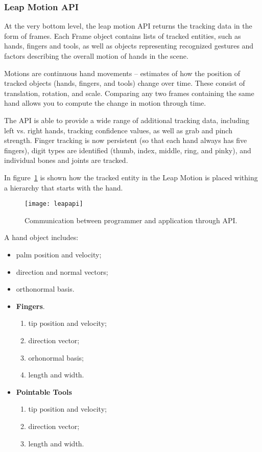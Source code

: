 {\subsubsection{Leap Motion API}
At the very bottom level, the leap motion API returns the tracking data in the form of frames. Each Frame object contains lists of tracked entities, such as hands, fingers and tools, as well as objects representing recognized gestures and factors describing the overall motion of hands in the scene.

Motions are continuous hand movements – estimates of how the position of tracked objects (hands, fingers, and tools) change over time. These consist of translation, rotation, and scale. Comparing any two frames containing the same hand allows you to compute the change in motion through time.

The API is able to provide a wide range of additional tracking data, including left vs. right hands, tracking confidence values, as well as grab and pinch strength. Finger tracking is now persistent (so that each hand always has five fingers), digit types are identified (thumb, index, middle, ring, and pinky), and individual bones and joints are tracked.

In \mbox{figure \ref{leapapi}} is shown how the tracked entity in the Leap Motion is placed withing a hierarchy that starts with the hand. 

\begin{figure}[!h]
\centering
\texttt{[image: leapapi]}
\caption{Communication between programmer and application through API. \cite{leapapi}}\label{leapapi}
\end{figure}

A hand object includes: 
\begin{itemize}
\item palm position and velocity;
\item direction and normal vectors;
\item orthonormal basis.
\item \textbf{Fingers}. 
\begin{enumerate}
\item tip position and velocity;
\item direction vector;
\item orhonormal basis;
\item length and width.
\end{enumerate}
\item \textbf{Pointable Tools}
\begin{enumerate}
\item tip position and velocity;
\item direction vector;
\item length and width.
\end{enumerate}
\end{itemize}

}
